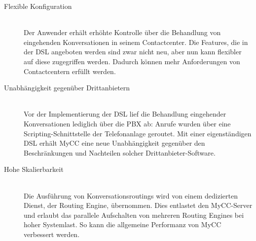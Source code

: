 \begin{description}
\item[Flexible Konfiguration] \hfill \\
Der Anwender erhält erhöhte Kontrolle über die Behandlung von eingehenden Konversationen in seinem Contactcenter. Die Features, die in der DSL angeboten werden sind zwar nicht neu, aber nun kann flexibler auf diese zugegriffen werden. Dadurch können mehr Anforderungen von Contactcentern erfüllt werden.
\item[Unabhängigkeit gegenüber Drittanbietern] \hfill \\
Vor der Implementierung der DSL lief die Behandlung eingehender Konversationen lediglich über die PBX ab: Anrufe wurden über eine Scripting-Schnittstelle der Telefonanlage geroutet. Mit einer eigenständigen DSL erhält MyCC eine neue Unabhängigkeit gegenüber den Beschränkungen und Nachteilen solcher Dritt\-an\-bie\-ter-Soft\-ware.
\item[Hohe Skalierbarkeit] \hfill \\
Die Ausführung von Konversationsroutings wird von einem dedizierten Dienst, der Routing Engine, übernommen. Dies entlastet den MyCC-Server und erlaubt das parallele Aufschalten von mehreren Routing Engines bei hoher Systemlast. So kann die allgemeine Performanz von MyCC verbessert werden.
\end{description}

